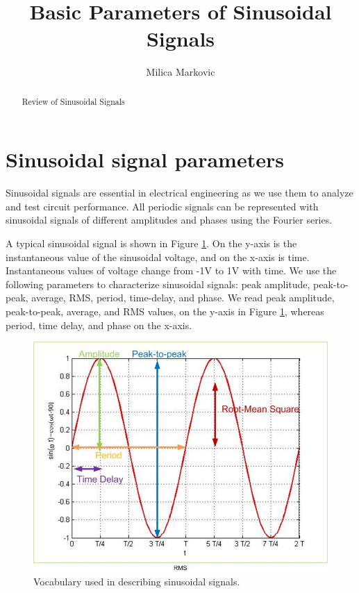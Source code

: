 \documentclass{ximera}
\title{Basic Parameters of Sinusoidal Signals}
\author{Milica Markovic}
\begin{document}
  
\begin{abstract}  
Review of Sinusoidal Signals
\end{abstract}  
\maketitle

\section{Sinusoidal signal parameters}

Sinusoidal signals are essential in electrical engineering as we use them to analyze and test circuit performance. All periodic signals can be represented with sinusoidal signals of different amplitudes and phases using the Fourier series. 

A typical sinusoidal signal is shown in Figure \ref{sinusoid}. On the y-axis is the instantaneous value of the sinusoidal voltage, and on the x-axis is time. Instantaneous values of voltage change from -1V to 1V with time. We use the following parameters to characterize sinusoidal signals: peak amplitude, peak-to-peak, average, RMS, period, time-delay, and phase. We read peak amplitude, peak-to-peak, average, and RMS values, on the y-axis in Figure \ref{sinusoid}, whereas period, time delay, and phase on the x-axis.

\begin{figure}[htbp]
\begin{center}
\includegraphics[scale=0.4]{../jpg/sinusoid.jpg}
\caption{Vocabulary used in describing sinusoidal signals.}
\label{sinusoid}
\end{center}
\end{figure} 
\end{document}

